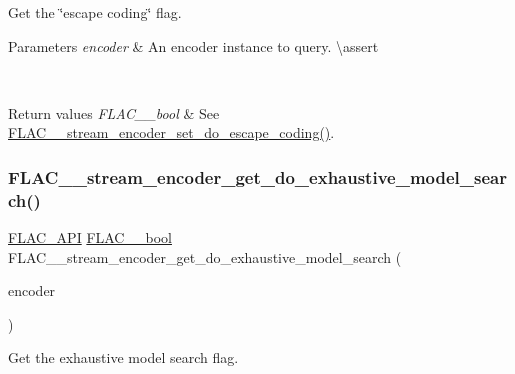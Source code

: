 Get the \char`\"{}escape coding\char`\"{} flag.


\begin{DoxyParams}{Parameters}
{\em encoder} & An encoder instance to query. \textbackslash{}assert 
\begin{DoxyCode}{1}
\end{DoxyCode}
 \\
\hline
\end{DoxyParams}

\begin{DoxyRetVals}{Return values}
{\em F\+L\+A\+C\+\_\+\+\_\+bool} & See \mbox{\hyperlink{group__flac__stream__encoder_gaa839d19b6d1b30ba0407d419bdb6fe67}{F\+L\+A\+C\+\_\+\+\_\+stream\+\_\+encoder\+\_\+set\+\_\+do\+\_\+escape\+\_\+coding()}}. \\
\hline
\end{DoxyRetVals}
\mbox{\label{group__flac__stream__encoder_gad429e31c7062baff987571d935b889f4}} 
\subsubsection{\texorpdfstring{FLAC\_\_stream\_encoder\_get\_do\_exhaustive\_model\_search()}{FLAC\_\_stream\_encoder\_get\_do\_exhaustive\_model\_search()}}
{\footnotesize\ttfamily \mbox{\hyperlink{group__flac__export_ga56ca07df8a23310707732b1c0007d6f5}{F\+L\+A\+C\+\_\+\+A\+PI}} \mbox{\hyperlink{ordinals_8h_a95103469f1cbd78b8cf250194985b34e}{F\+L\+A\+C\+\_\+\+\_\+bool}} F\+L\+A\+C\+\_\+\+\_\+stream\+\_\+encoder\+\_\+get\+\_\+do\+\_\+exhaustive\+\_\+model\+\_\+search (\begin{DoxyParamCaption}\item[{const \mbox{\hyperlink{struct_f_l_a_c_____stream_encoder}{F\+L\+A\+C\+\_\+\+\_\+\+Stream\+Encoder}} $\ast$}]{encoder }\end{DoxyParamCaption})}

Get the exhaustive model search flag.


